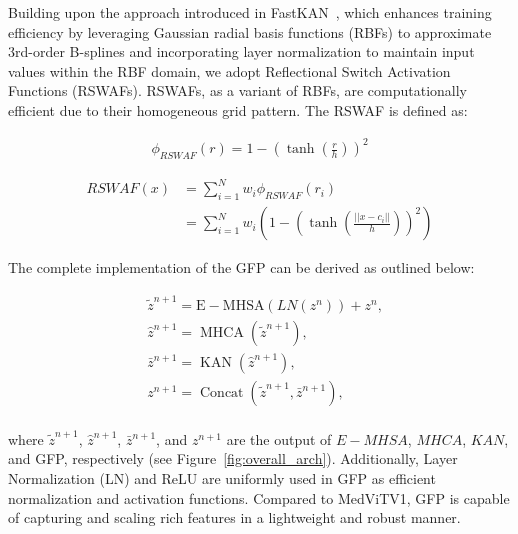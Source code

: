 \documentclass[times,twocolumn,final]{elsarticle}
\begin{document}
Building upon the approach introduced in FastKAN~\cite{li2024kolmogorov}, which enhances training efficiency by leveraging Gaussian radial basis functions (RBFs) to approximate 3rd-order B-splines and incorporating layer normalization to maintain input values within the RBF domain, we adopt Reflectional Switch Activation Functions (RSWAFs). RSWAFs, as a variant of RBFs, are computationally efficient due to their homogeneous grid pattern. The RSWAF is defined as:

\begin{equation}
\begin{aligned}
\phi_{\mathit{RSWAF}}(r) = 1 - \left(\tanh\left(\frac{r}{h}\right)\right)^2
\end{aligned}
\label{eq:rswaf_funct}
\end{equation}


\begin{equation}
\begin{aligned}
\mathit{RSWAF}(x) &= \sum_{i=1}^{N} w_i \phi_{\mathit{RSWAF}}(r_i) \\
&= \sum_{i=1}^{N} w_i \left(1 - \left(\tanh\left(\frac{||x - c_i||}{h}\right)\right)^2\right)
\end{aligned}
\label{eq:rswaf_network}
\end{equation}




\noindent
The complete implementation of the GFP can be derived as outlined below:

\begin{equation}
    \begin{aligned}
        & \tilde{z}^{n+1} =\mathrm{E}-\mathrm{MHSA}(LN(z^{n}))+z^{n}, \\
        & \hat{z}^{n+1} =\operatorname{MHCA}(\tilde{z}^{n+1}), \\
        & \bar{z}^{n+1} =\operatorname{KAN}(\hat{z}^{n+1}),\\
        & z^{n+1} =\operatorname{Concat}(\tilde{z}^{n+1}, \bar{z}^{n+1}), \\
    \end{aligned}
\end{equation}

\noindent
where $\tilde{z}^{n+1}$, $\hat{z}^{n+1}$, $\bar{z}^{n+1}$, and $z^{n+1}$ are the output of $E-MHSA$, $MHCA$, $KAN$, and GFP, respectively (see Figure~\ref{fig:overall_arch}). Additionally, Layer Normalization (LN) and ReLU are uniformly used in GFP as efficient normalization and activation functions. Compared to MedViTV1, GFP is capable of capturing and scaling rich features in a lightweight and robust manner.
\end{document}
